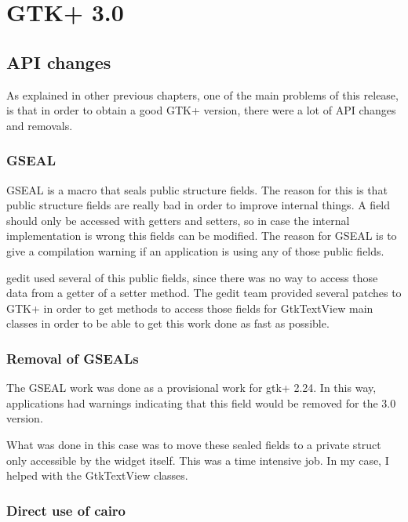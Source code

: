 

\chapter{GTK+ 3.0}


\section{API changes}

As explained in other previous chapters, one of the main problems of this release, is that in order to obtain a good GTK+ version, there were a lot of API changes and removals.

\subsection{GSEAL}

GSEAL is a macro that seals public structure fields. The reason for this is that public structure fields are really bad 
in order to improve internal things. A field should only be accessed with getters and setters, so in case the internal 
implementation is wrong this fields can be modified. The reason for GSEAL is to give a compilation warning if an application 
is using any of those public fields.

gedit used several of this public fields, since there was no way to access those data from a getter of a setter method. 
The gedit team provided several patches to GTK+ in order to get methods to access those fields for GtkTextView main classes 
in order to be able to get this work done as fast as possible.

\subsection{Removal of GSEALs}

The GSEAL work was done as a provisional work for gtk+ 2.24.  In this way,  applications had warnings indicating that this field 
would be removed for the 3.0 version.

What was done in this case was to move these sealed fields to a private struct only accessible by the widget itself. 
This was a time intensive job. In my case, I helped with the GtkTextView classes.

\subsection{Direct use of cairo}

